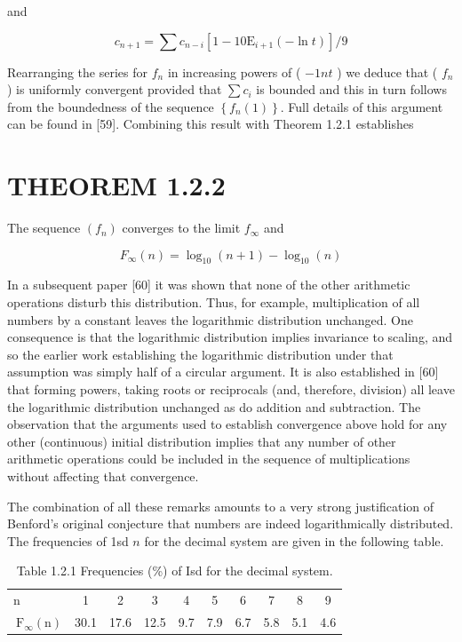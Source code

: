 \documentclass[10pt]{article}
\begin{document}
and


\begin{equation*}
c_{n+1}=\sum c_{n-i}\left[1-10 \mathrm{E}_{i+1}(-\ln t)\right] / 9 \tag{1.2.8}
\end{equation*}


Rearranging the series for $f_{n}$ in increasing powers of ( $-1 n t$ ) we deduce that ( $f_{n}$ ) is uniformly convergent provided that $\sum c_{i}$ is bounded and this in turn follows from the boundedness of the sequence $\left\{f_{n}(1)\right\}$. Full details of this argument can be found in [59]. Combining this result with Theorem 1.2.1 establishes

\section*{THEOREM 1.2.2}
The sequence $\left(f_{n}\right)$ converges to the limit $f_{\infty}$ and


\begin{equation*}
F_{\infty}(n)=\log _{10}(n+1)-\log _{10}(n) \tag{1.2.9}
\end{equation*}


In a subsequent paper [60] it was shown that none of the other arithmetic operations disturb this distribution. Thus, for example, multiplication of all numbers by a constant leaves the logarithmic distribution unchanged. One consequence is that the logarithmic distribution implies invariance to scaling, and so the earlier work establishing the logarithmic distribution under that assumption was simply half of a circular argument. It is also established in [60] that forming powers, taking roots or reciprocals (and, therefore, division) all leave the logarithmic distribution unchanged as do addition and subtraction. The observation that the arguments used to establish convergence above hold for any other (continuous) initial distribution implies that any number of other arithmetic operations could be included in the sequence of multiplications without affecting that convergence.

The combination of all these remarks amounts to a very strong justification of Benford's original conjecture that numbers are indeed logarithmically distributed. The frequencies of 1sd $n$ for the decimal system are given in the following table.

\begin{table}[h]
\begin{center}
\captionsetup{labelformat=empty}
\caption{Table 1.2.1 Frequencies (\%) of Isd for the decimal system.}
\begin{tabular}{lccccccccc}
n & 1 & 2 & 3 & 4 & 5 & 6 & 7 & 8 & 9 \\
$\mathrm{~F}_{\infty}(\mathrm{n})$ & 30.1 & 17.6 & 12.5 & 9.7 & 7.9 & 6.7 & 5.8 & 5.1 & 4.6 \\
\end{tabular}
\end{center}
\end{table}
\end{document}
